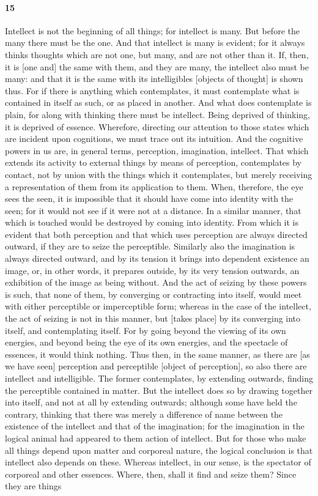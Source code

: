 \documentclass{article}
\begin{document}
\paragraph{15} Intellect is not the beginning of all things; for intellect is many. But before the many there must be the one. And that intellect is many is evident; for it always thinks thoughts which are not one, but many, and are not other than it. If, then, it is [one and] the same with them, and they are many, the intellect also must be many: and that it is the same with its intelligibles [objects of thought] is shown thus. For if there is anything which contemplates, it must contemplate what is contained in itself as such, or as placed in another. And what does contemplate is plain, for along with thinking there must be intellect. Being deprived of thinking, it is deprived of essence. Wherefore, directing our attention to those states which are incident upon cognitions, we must trace out its intuition. And the cognitive powers in us are, in general terms, perception, imagination, intellect. That which extends its activity to external things by means of perception, contemplates by contact, not by union with the things which it contemplates, but merely receiving a representation of them from its application to them. When, therefore, the eye sees the seen, it is impossible that it should have come into identity with the seen; for it would not see if it were not at a distance. In a similar manner, that which is touched would be destroyed by coming into identity. From which it is evident that both perception and that which uses perception are always directed outward, if they are to seize the perceptible. Similarly also the imagination is always directed outward, and by its tension it brings into dependent existence an image, or, in other words, it prepares outside, by its very tension outwards, an exhibition of the image as being without. And the act of seizing by these powers is such, that none of them, by converging or contracting into itself, would meet with either perceptible or imperceptible form; whereas in the case of the intellect, the act of seizing is not in this manner, but [takes place] by its converging into itself, and contemplating itself. For by going beyond the viewing of its own energies, and beyond being the eye of its own energies, and the spectacle of essences, it would think nothing. Thus then, in the same manner, as there are [as we have seen] perception and perceptible [object of perception], so also there are intellect and intelligible. The former contemplates, by extending outwards, finding the perceptible contained in matter. But the intellect does so by drawing together into itself, and not at all by extending outwards; although some have held the contrary, thinking that there was merely a difference of name between the existence of the intellect and that of the imagination; for the imagination in the logical animal had appeared to them action of intellect. But for those who make all things depend upon matter and corporeal nature, the logical conclusion is that intellect also depends on these. Whereas intellect, in our sense, is the spectator of corporeal and other essences. Where, then, shall it find and seize them? Since they are things 
\end{document}
